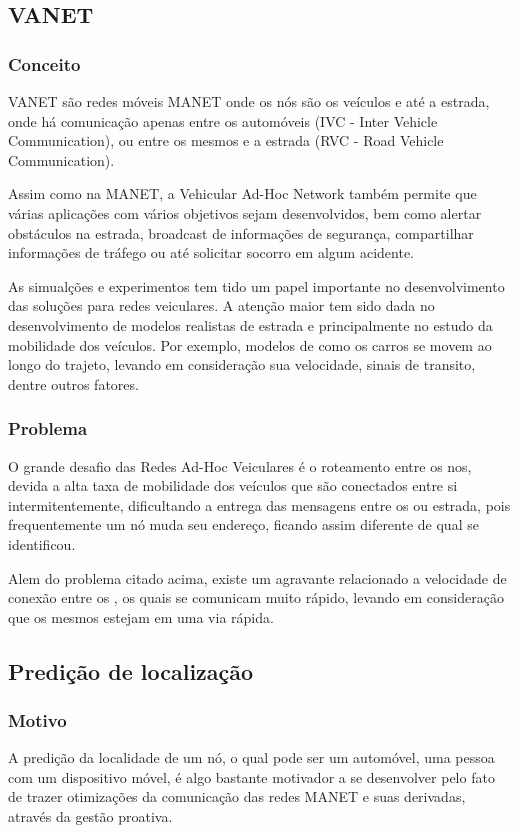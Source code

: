 \documentclass[12pt, %
openright, 
oneside,
a4paper,
brazil]{facom-ufu-abntex2}
\begin{document}
\subsection{VANET}
\subsubsection{Conceito}
VANET são redes móveis MANET onde os nós são os veículos e até a estrada, onde há comunicação apenas entre os automóveis (IVC - Inter Vehicle Communication), ou entre os mesmos e a estrada (RVC - Road Vehicle Communication).

Assim como na MANET, a Vehicular Ad-Hoc Network também permite que várias aplicações com vários objetivos sejam desenvolvidos, bem como alertar obstáculos na estrada, broadcast de informações de segurança, compartilhar informações de tráfego ou até solicitar socorro em algum acidente.

As simualções e experimentos tem tido um papel importante no desenvolvimento das soluções para redes veiculares. A atenção maior tem sido dada no desenvolvimento de modelos realistas de estrada e principalmente no estudo da mobilidade dos veículos. Por exemplo, modelos de como os carros se movem ao longo do trajeto, levando em consideração sua velocidade, sinais de transito, dentre outros fatores. 

\subsubsection{Problema}
O grande desafio das Redes Ad-Hoc Veiculares é o roteamento entre os nos, devida a alta taxa de mobilidade dos veículos que são conectados entre si intermitentemente, dificultando a entrega das mensagens entre os  ou estrada, pois frequentemente um nó muda seu endereço, ficando assim diferente de qual se identificou.

Alem do problema citado acima, existe um agravante relacionado a velocidade de conexão entre os , os quais se comunicam muito rápido, levando em consideração que os mesmos estejam em uma via rápida.

\subsection{Predição de localização}
\subsubsection{Motivo}
A predição da localidade de um nó, o qual pode ser um automóvel, uma pessoa com um dispositivo móvel, é algo bastante motivador a se desenvolver pelo fato de trazer otimizações da comunicação das redes MANET e suas derivadas, através da gestão proativa. \cite{6838650}
\end{document}
